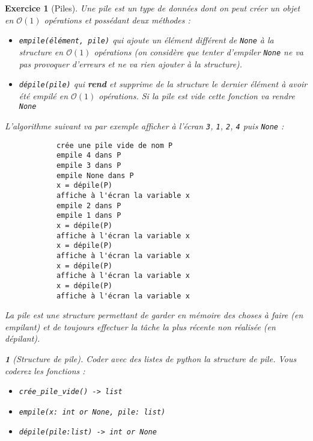 \documentclass{article}
\theoremstyle{exostyle}
\newtheorem{exo}{Exercice}
\theoremstyle{partiestyle}
\newtheorem{partie}{}[exo]
\theoremstyle{questionstyle}
\begin{document}
\clearpage
\begin{exo}[Piles]
        Une pile est un type de données dont on peut créer un objet en $\mathcal{O}(1)$ opérations et possédant deux méthodes :
        \begin{itemize}
            \item \verb|empile(élément, pile)| qui ajoute un élément différent de \verb|None| à la structure en $\mathcal{O}(1)$ opérations (on considère que tenter d'empiler \verb|None| ne va pas provoquer d'erreurs et ne va rien ajouter à la structure).
            \item \verb|dépile(pile)| qui {\bf rend} et supprime de la structure le dernier élément à avoir été empilé en $\mathcal{O}(1)$ opérations. Si la pile est vide cette fonction va rendre \verb|None|
        \end{itemize}
        

        L'algorithme suivant va par exemple afficher à l'écran \verb|3|, \verb|1|, \verb|2|, \verb|4| puis \verb|None| :
        \begin{verbatim}
            crée une pile vide de nom P
            empile 4 dans P
            empile 3 dans P
            empile None dans P
            x = dépile(P)
            affiche à l'écran la variable x
            empile 2 dans P
            empile 1 dans P
            x = dépile(P)
            affiche à l'écran la variable x
            x = dépile(P)
            affiche à l'écran la variable x
            x = dépile(P)
            affiche à l'écran la variable x
            x = dépile(P)
            affiche à l'écran la variable x
        \end{verbatim}

        La pile est une structure permettant de garder en mémoire des choses à faire (en empilant) et de toujours effectuer la tâche la plus récente non réalisée (en dépilant).
        
    \begin{partie}[Structure de pile]

            Coder avec des listes de python la structure de pile. Vous coderez les fonctions :
            \begin{itemize}
                \item \verb|crée_pile_vide() -> list|
                \item \verb|empile(x: int or None, pile: list)|                
                \item \verb|dépile(pile:list) -> int or None|    
            \end{itemize}            


\end{partie}
\end{exo}
\end{document}
